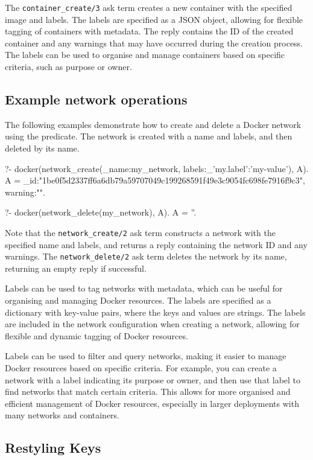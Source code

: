 The \verb$container_create/3$ ask term creates a new container with the
specified image and labels. The labels are specified as a JSON object,
allowing for flexible tagging of containers with metadata. The reply
contains the ID of the created container and any warnings that may have
occurred during the creation process. The labels can be used to organise
and manage containers based on specific criteria, such as purpose or
owner.

\subsection{Example network operations}

The following examples demonstrate how to create and delete a Docker network
using the  predicate. The network is created with a name and labels,
and then deleted by its name.

\begin{code}
?- docker(network_create(_{name:my_network, labels:_{'my.label':'my-value'}}), A).
A = _{id:"1be0f5d2337ff6a6db79a59707049c199268591f49e3c9054fc698fe7916f9c3", warning:""}.

?- docker(network_delete(my_network), A).
A = ''.
\end{code}

Note that the \verb$network_create/2$ ask term constructs a network with
the specified name and labels, and returns a reply containing the
network ID and any warnings. The \verb$network_delete/2$ ask term deletes
the network by its name, returning an empty reply if successful.

Labels can be used to tag networks with metadata, which can be useful
for organising and managing Docker resources. The labels are specified
as a dictionary with key-value pairs, where the keys and values are
strings. The labels are included in the network configuration when
creating a network, allowing for flexible and dynamic tagging of Docker
resources.

Labels can be used to filter and query networks, making it easier to
manage Docker resources based on specific criteria. For example, you can
create a network with a label indicating its purpose or owner, and then
use that label to find networks that match certain criteria. This allows
for more organised and efficient management of Docker resources,
especially in larger deployments with many networks and containers.

\subsection{Restyling Keys}

